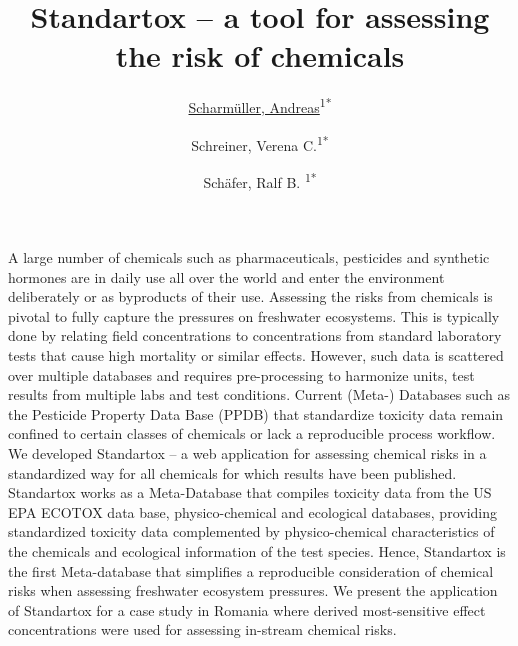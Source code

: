 \documentclass[10pt, a4paper]{article}
\begin{document}
\title{\textbf{Standartox – a tool for assessing the risk of chemicals}}

\author{\uline{Scharmüller, Andreas}\textsuperscript{1{*}}}
\author{Schreiner, Verena C.\textsuperscript{1{*}}}
\author{Schäfer, Ralf B. \textsuperscript{1{*}}}
\date{\vspace{-5ex}}







\maketitle

A large number of chemicals such as pharmaceuticals, pesticides and synthetic hormones are in daily use all over the world and enter the environment deliberately or as byproducts of their use. Assessing the risks from chemicals is pivotal to fully capture the pressures on freshwater ecosystems. This is typically done by relating field concentrations to concentrations from standard laboratory tests that cause high mortality or similar effects. However, such data is scattered over multiple databases and requires pre-processing to harmonize units, test results from multiple labs and test conditions. Current (Meta-) Databases such as the Pesticide Property Data Base (PPDB) that standardize toxicity data remain confined to certain classes of chemicals or lack a reproducible process workflow. We developed Standartox – a web application for assessing chemical risks in a standardized way for all chemicals for which results have been published. Standartox works as a Meta-Database that compiles toxicity data from the US EPA ECOTOX data base, physico-chemical and ecological databases, providing standardized toxicity data complemented by physico-chemical characteristics of the chemicals and ecological information of the test species. Hence, Standartox is the first Meta-database that simplifies a reproducible consideration of chemical risks when assessing freshwater ecosystem pressures. We present the application of Standartox for a case study in Romania where derived most-sensitive effect concentrations were used for assessing in-stream chemical risks.

\lipsum
\end{document}
